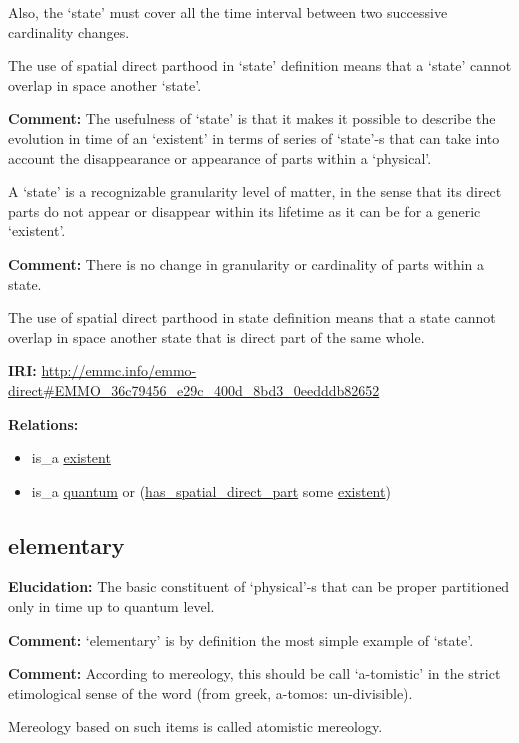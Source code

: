 \documentclass[a4paper,]{report}
\providecommand{\tightlist}{%
  \setlength{\itemsep}{0pt}\setlength{\parskip}{0pt}}
\begin{document}
Also, the `state' must cover all the time interval between two
successive cardinality changes.

The use of spatial direct parthood in `state' definition means that a
`state' cannot overlap in space another `state'.

\textbf{Comment:} The usefulness of `state' is that it makes it possible
to describe the evolution in time of an `existent' in terms of series of
`state'-s that can take into account the disappearance or appearance of
parts within a `physical'.

A `state' is a recognizable granularity level of matter, in the sense
that its direct parts do not appear or disappear within its lifetime as
it can be for a generic `existent'.

\textbf{Comment:} There is no change in granularity or cardinality of
parts within a state.

The use of spatial direct parthood in state definition means that a
state cannot overlap in space another state that is direct part of the
same whole.

\textbf{IRI:}
\url{http://emmc.info/emmo-direct\#EMMO_36c79456_e29c_400d_8bd3_0eedddb82652}

\textbf{Relations:}

\begin{itemize}
\tightlist
\item
  is\_a \protect\hyperlink{existent}{existent}
\item
  is\_a \protect\hyperlink{quantum}{quantum} or
  (\protect\hyperlink{has_spatial_direct_part}{has\_spatial\_direct\_part}
  some \protect\hyperlink{existent}{existent})
\end{itemize}

\hypertarget{elementary}{%
\subsection{elementary}\label{elementary}}

\textbf{Elucidation:} The basic constituent of `physical'-s that can be
proper partitioned only in time up to quantum level.

\textbf{Comment:} `elementary' is by definition the most simple example
of `state'.

\textbf{Comment:} According to mereology, this should be call
`a-tomistic' in the strict etimological sense of the word (from greek,
a-tomos: un-divisible).

Mereology based on such items is called atomistic mereology.
\end{document}
